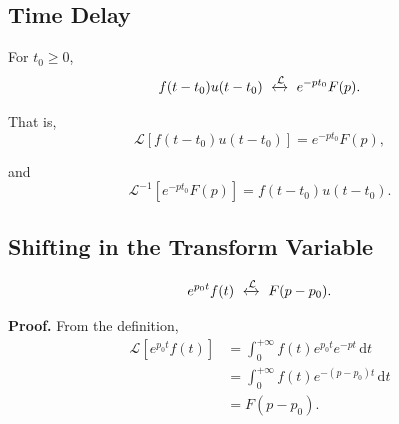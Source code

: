 \documentclass[11pt,a4paper]{article}
\theoremstyle{definition}
\theoremstyle{plain}
\begin{document}
\subsection{Time Delay}

For \(t_0\ge0\),
\[
f(t-t_0)u(t-t_0)
\ \xleftrightarrow{\mathcal L}\
e^{-pt_0}F(p).
\]

That is,
\[
\mathcal L[f(t-t_0)u(t-t_0)]
=e^{-pt_0}F(p),
\]

and
\[
\mathcal L^{-1}[e^{-pt_0}F(p)]
=f(t-t_0)u(t-t_0).
\]

\subsection{Shifting in the Transform Variable}
\[
e^{p_0t}f(t)
\ \xleftrightarrow{\mathcal L}\
F(p-p_0).
\]

\textbf{Proof.} From the definition,
\[
\begin{aligned}
\mathcal L[e^{p_0t}f(t)]
&=\int_0^{+\infty}f(t)e^{p_0t}e^{-pt}\,\mathrm dt\\
&=\int_0^{+\infty}f(t)e^{-(p-p_0)t}\,\mathrm dt\\
&=F(p-p_0).
\end{aligned}
\]
\end{document}
